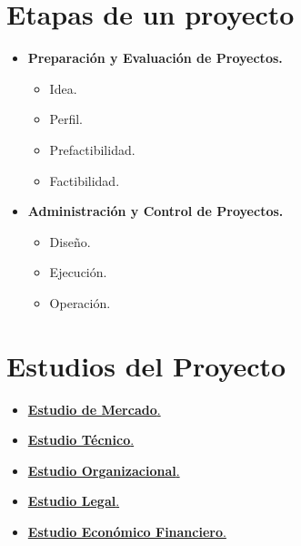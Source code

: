 \documentclass{templateNote}
\begin{document}
\section{Etapas de un proyecto}
\begin{itemize}
  \item \textbf{Preparación y Evaluación de Proyectos.}
  \begin{itemize}
    \item Idea.
    \item Perfil.
    \item Prefactibilidad.
    \item Factibilidad.
  \end{itemize}

  \item \textbf{Administración y Control de Proyectos.}
  \begin{itemize}
    \item Diseño.
    \item Ejecución.
    \item Operación.
  \end{itemize}
\end{itemize}

\newpage
\section{Estudios del Proyecto}
\begin{itemize}
  \item \hyperlink{EM}{\textbf{Estudio de Mercado}.}
  \item \hyperlink{ET}{\textbf{Estudio Técnico}.}
  \item \hyperlink{EO}{\textbf{Estudio Organizacional}.}
  \item \hyperlink{EL}{\textbf{Estudio Legal}.}
  \item \hyperlink{EEF}{\textbf{Estudio Económico Financiero}.}
\end{itemize}
\end{document}
